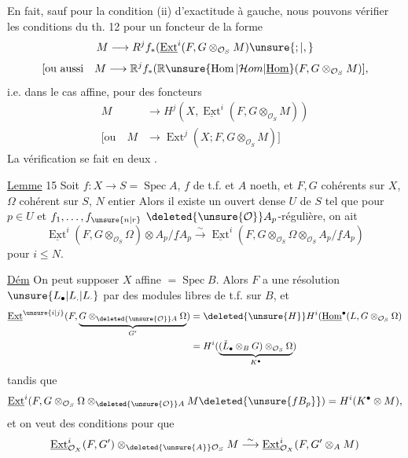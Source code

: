 En fait, sauf pour la condition (ii) d'exactitude à gauche, nous pouvons vérifier les conditions du th. 12  pour un foncteur de la forme
\[
 M\longrightarrow R^{j}f_*(\underline{\operatorname{Ext}}^{i}(F,G\otimes_{\mathcal O_S}M)\unsure{;|,}
\]
\[
 [\text{ou aussi}\quad M\longrightarrow\mathbb R^{j}f_*(\mathbb R\unsure{\operatorname{Hom}|\mathcal Hom|\underline{\operatorname{Hom}}}(F,G\otimes_{\mathcal O_S}M)],
\]
i.e. dans le cas affine, pour des foncteurs
\[
 \begin{aligned}
 M&\longrightarrow H^j(X,\underline{\operatorname{Ext}}^i(F,G\otimes_{\mathcal O_S}M))\\
 {}[\text{ou}\quad M&\longrightarrow \operatorname{Ext}^j(X; F,G\otimes_{\mathcal O_S}M)]
 \end{aligned}
\]
La vérification se fait en deux .

\uline{Lemme} 15 Soit $f:X\longrightarrow S=\operatorname{Spec}A$, $f$ de t.f. et $A$ noeth, et $F,G$  cohérents sur $X$, $\Omega$ cohérent sur $S$, $N$ entier Alors il existe un ouvert dense $U$ de $S$ tel que pour $p\in U$ et $f_1,\ldots,f_{\unsure{n|r}}$   $\deleted{\unsure{\mathcal O}}A_p$-régulière, on ait
\[
 \underline{\operatorname{Ext}}^i(F,G\otimes_{\mathcal O_S}\Omega)\otimes A_p/\underline f A_p
 \overset{\sim}{\longrightarrow}\underline{\operatorname{Ext}}^i(F,G\otimes_{\mathcal O_S}\Omega\otimes_{\mathcal O_S}A_p/\underline f A_p)
\]
pour $i\leq N$.

\uline{Dém} On peut supposer $X$ affine $=\operatorname{Spec}B$. Alors $F$ a une résolution $\unsure{L_{\bullet}|L_{.}|L_{\cdot}}$ par des modules libres de t.f. sur $B$, et
\[
 \begin{aligned}
 \underline{\operatorname{Ext}}^{\unsure{i|j}}(F,\underbrace{G\otimes_{\deleted{\unsure{\mathcal O}}A}\Omega}_{G'})
 &=\deleted{\unsure{H}}H^i(\underline{\operatorname{Hom}}^\bullet(L,G\otimes_{\mathcal O_S}\Omega)\\
 &= H^i(\underbrace{(\check{L}_{\bullet}\otimes_B G)\otimes_{\mathcal O_S}\Omega}_{K^\bullet})
 \end{aligned}
\]
tandis que
\[
 \underline{\operatorname{Ext}}^i(F,G\otimes_{\mathcal O_S}\Omega\otimes_{\deleted{\unsure{\mathcal O}}A}M\deleted{\unsure{fB_p}})=H^i(K^\bullet\otimes M),
\]
et on veut des conditions pour que
\[
 \underline{\operatorname{Ext}}^i_{\mathcal O_X}(F,G')\otimes_{\deleted{\unsure{A}}\mathcal O_S}M
 \overset{\sim}{\longrightarrow}\underline{\operatorname{Ext}}^i_{\mathcal O_X}(F,G'\otimes_A M)
\]
